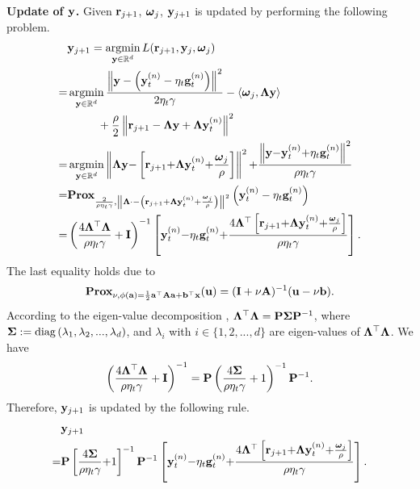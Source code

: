 \documentclass[journal]{IEEEtran}
\begin{document}
\textbf{Update of ${\bf y}$.} Given ${\bf r}_{j+1}$, $\boldsymbol{\omega}_j$, ${\bf y}_{j+1}$ is updated by performing the following problem.
\begin{align}
\nonumber
&\y_{j+1} = \argmin_{\y\in\RR^d} L(\r_{j+1}, \y_j, \bomega_j) \\ \nonumber
= & \argmin_{\y\in\RR^d} \frac{\lrnorm{\y - \lrincir{\y_t^{(n)} - \eta_t\g_t^{(n)}}}^2}{2\eta_t\gamma} - \lrangle{\bomega_j, \bLambda \y} \\ \nonumber 
& {~~~~~~~~} + \frac{\rho}{2}\lrnorm{\r_{j+1} - \bLambda \y + \bLambda\y_t^{(n)}}^2 \\ \nonumber
= & \argmin_{\y\in\RR^d} \small \lrnorm{\bLambda \y \mathrm{-} \left[\r_{j+1} \mathrm{+} \bLambda\y_t^{(n)} \mathrm{+} \frac{\bomega_j}{\rho}\right]}^2 \mathrm{+} \frac{\lrnorm{\y \mathrm{-} \y_t^{(n)} \mathrm{+} \eta_t\g_t^{(n)}}^2}{\rho\eta_t\gamma} \\ \nonumber
 = & \Prox_{\frac{2}{\rho\eta_t\gamma}, \lrnorm{\bLambda \cdot - \lrincir{\r_{j+1} + \bLambda\y_t^{(n)} + \frac{\bomega_j}{\rho}}}^2} \lrincir{\y_t^{(n)} - \eta_t\g_t^{(n)}} \\ \nonumber
= & \small \lrincir{\frac{4\bLambda^\top\bLambda}{\rho\eta_t\gamma} + \I}^{-1}\left[\y_t^{(n)} \mathrm{-} \eta_t\g_t^{(n)}\mathrm{+}\frac{4\bLambda^\top\left[\r_{j+1} \mathrm{+} \bLambda\y_t^{(n)} \mathrm{+} \frac{\bomega_j}{\rho}\right]}{\rho\eta_t\gamma}\right].
\end{align} The last equality holds due to 
\begin{align}
\nonumber
\textbf{Prox}_{\nu, \phi({\bf a}) = \frac{1}{2}{\bf a}^\top{\bf A}{\bf a}+{\bf b}^\top{\bf x}}({\bf u}) = ({\bf I} + \nu{\bf A})^{-1}({\bf u}-\nu{\bf b}).
\end{align} According to the eigen-value decomposition \cite{xx}, $\mathbf{\Lambda}^\top\mathbf{\Lambda} = {\bf P}\boldsymbol{\Sigma}{\bf P}^{-1}$, where $\boldsymbol{\Sigma} := {\rm diag}\left( \lambda_1, \lambda_2, ..., \lambda_d \right)$, and $\lambda_i$ with $i\in\{1,2, ..., d\}$ are eigen-values of $\mathbf{\Lambda}^\top\mathbf{\Lambda}$. We have 
\begin{align}
\nonumber
\left( \frac{4\mathbf{\Lambda}^\top\mathbf{\Lambda}}{\rho\eta_t\gamma} + {\bf I} \right)^{-1} = {\bf P}\left( \frac{4\boldsymbol{\Sigma}}{\rho\eta_t\gamma} + 1 \right)^{-1}{\bf P}^{-1}.
\end{align} Therefore, ${\bf y}_{j+1}$ is updated by the following rule.
\begin{align}
\nonumber
&\y_{j+1}  \\ \nonumber
= & \small \P\left[\frac{4\bSigma}{\rho\eta_t\gamma} \mathrm{+} 1\right]^{\mathrm{-1}}\P^{\mathrm{-1}}\left[\y_t^{(n)} \mathrm{-} \eta_t\g_t^{(n)}\mathrm{+}\frac{4\bLambda^\top\left[\r_{j+1} \mathrm{+} \bLambda\y_t^{(n)} \mathrm{+} \frac{\bomega_j}{\rho}\right]}{\rho\eta_t\gamma}\right].
\end{align} 
\end{document}
